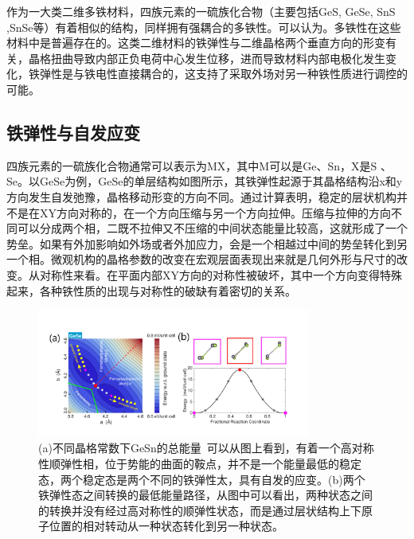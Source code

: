 作为一大类二维多铁材料\cite{ISI:000230853300010}，四族元素的一硫族化合物（主要包括GeS, GeSe, SnS ,SnSe等）有着相似的结构，同样拥有强耦合的多铁性。\cite{ISI:000318143300005}\cite{ISI:000309505400023}可以认为。多铁性在这些材料中是普遍存在的。这类二维材料的铁弹性与二维晶格两个垂直方向的形变有关，晶格扭曲导致内部正负电荷中心发生位移，进而导致材料内部电极化发生变化，铁弹性是与铁电性直接耦合的，这支持了采取外场对另一种铁性质进行调控的可能。

\subsection{铁弹性与自发应变}

四族元素的一硫族化合物通常可以表示为MX，其中M可以是Ge、Sn，X是S 、Se。以GeSe为例，GeSe的单层结构如图所示，其铁弹性起源于其晶格结构沿x和y方向发生自发弛豫，晶格移动形变的方向不同。\cite{ISI:000363915300044}通过计算表明，稳定的层状机构并不是在XY方向对称的，在一个方向压缩与另一个方向拉伸。压缩与拉伸的方向不同可以分成两个相，二既不拉伸又不压缩的中间状态能量比较高，这就形成了一个势垒。如果有外加影响如外场或者外加应力，会是一个相越过中间的势垒转化到另一个相。微观机构的晶格参数的改变在宏观层面表现出来就是几何外形与尺寸的改变。从对称性来看。在平面内部XY方向的对称性被破坏，其中一个方向变得特殊起来，各种铁性质的出现与对称性的破缺有着密切的关系。

\begin{figure}[h]
    \centering
\includegraphics[width=0.8\textwidth]{./pic/017.png}
\caption{(a)不同晶格常数下GeSn的总能量\ 可以从图上看到，有着一个高对称性顺弹性相，位于势能的曲面的鞍点，并不是一个能量最低的稳定态，两个稳定态是两个不同的铁弹性太，具有自发的应变。(b)两个铁弹性态之间转换的最低能量路径，从图中可以看出，两种状态之间的转换并没有经过高对称性的顺弹性状态，而是通过层状结构上下原子位置的相对转动从一种状态转化到另一种状态。}

\label{dog017}
\end{figure}

